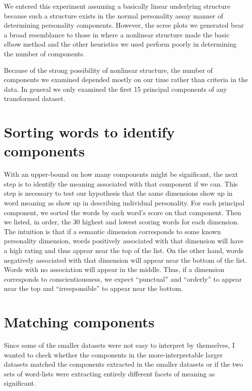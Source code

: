 \documentclass[eric_thesis.tex]{subfiles}
\begin{document}
We entered this experiment assuming a basically 
linear underlying structure because such a structure exists in the normal 
personality assay manner of determining personality components. However, the 
scree plots we generated bear a broad resemblance to those in  where a nonlinear structure made the basic 
elbow method and the other heuristics we used perform poorly in determining the 
number of components.

Because of the strong possibility of nonlinear structure, the number of 
components we examined depended mostly on our time rather than criteria in the 
data. In general we only examined the first 15 principal components of any
transformed dataset.

\section{Sorting words to identify components}

With an upper-bound on how many components might be significant, the next 
step is to identify the meaning associated with that component if we can. This 
step is necessary to test our hypothesis that the same dimensions show up in 
word meaning as show up in describing individual personality. For each 
principal 
component, we sorted the words by each word's score on that component. Then we 
listed, in order, the 30 highest and lowest scoring words for each dimension. 
The intuition is that if a semantic dimension corresponds to some known 
personality dimension, words positively associated with that dimension will 
have 
a high rating and thus appear near the top of the list. On the other hand, 
words 
negatively associated with that dimension will appear near the bottom of the 
list. Words with no association will appear in the middle. Thus, if a dimension 
corresponds to conscientiousness, we expect ``punctual'' and ``orderly'' to 
appear near the top and ``irresponsible'' to appear near the bottom.

\section{Matching components}

Since some of the smaller datasets were not easy to interpret by themselves, I
wanted to check whether the components in the more-interpretable larger datasets
matched the components extracted in the smaller datasets or if the two sets
of word-lists were extracting entirely different facets of meaning as
significant.
\end{document}
